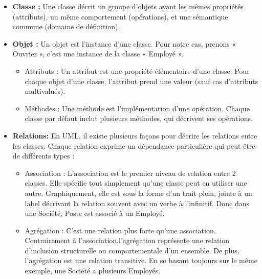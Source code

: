 \begin{itemize}
    
    
    \item \textbf{Classe :} 
    Une classe décrit un groupe d’objets ayant les mêmes propriétés (attributs), un même comportement (opérations), et une sémantique commune (domaine de définition).\\
    
    \item \textbf{Objet :} Un objet est l’instance d’une classe. Pour notre cas, prenons « Ouvrier », c’est une
    instance de la classe « Employé ».
    
    \begin{itemize}
        
    \item Attributs : Un attribut est une propriété élémentaire d’une classe. Pour chaque objet d’une classe, l’attribut prend une valeur (sauf cas d’attributs multivalués).
    
    \item Méthodes : Une méthode est l’implémentation d’une opération. Chaque classe par défaut inclut plusieurs méthodes, qui décrivent ses opérations.
    
    
   \end{itemize}
    
    \item \textbf{Relations:}
    En UML, il existe plusieurs façons pour décrire les relations entre les classes. Chaque relation exprime un dépendance particulière qui peut être de différents types :
    
    \begin{itemize}
        
    \item Association : L'association est le premier niveau de relation entre 2 classes. Elle spécifie tout simplement qu'une classe peut en utiliser une autre. Graphiquement, elle est sous la forme d’un trait plein, jointe à un label décrivant la relation souvent avec un verbe à l’infinitif. Donc dans une Société, Poste est associé à un Employé.
    
    
    \item Agrégation : C’est une relation plus forte qu’une association. Contrairement à l’association,l’agrégation représente une relation d’inclusion structurelle ou comportementale d’un ensemble. De plus, l’agrégation est une relation transitive. En se basant toujours sur le même exemple, une Société a plusieurs Employés.
    

\end{itemize}
\end{itemize}
